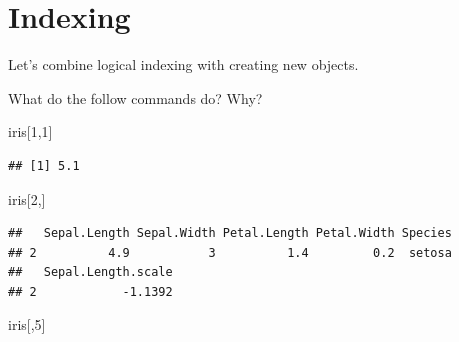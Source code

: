 \documentclass[]{book}
\newenvironment{Shaded}{\begin{snugshade}}{\end{snugshade}}
\newcommand{\KeywordTok}[1]{\textcolor[rgb]{0.13,0.29,0.53}{\textbf{#1}}}
\newcommand{\DecValTok}[1]{\textcolor[rgb]{0.00,0.00,0.81}{#1}}
\newcommand{\StringTok}[1]{\textcolor[rgb]{0.31,0.60,0.02}{#1}}
\newcommand{\OperatorTok}[1]{\textcolor[rgb]{0.81,0.36,0.00}{\textbf{#1}}}
\newcommand{\NormalTok}[1]{#1}
\theoremstyle{definition}
\theoremstyle{definition}
\theoremstyle{definition}
\theoremstyle{remark}
\begin{document}
\begin{Shaded}
\end{Shaded}

\section{Indexing}\label{indexing}

Let's combine logical indexing with creating new objects.

What do the follow commands do? Why?

\begin{Shaded}
\begin{Highlighting}[]
\NormalTok{iris[}\DecValTok{1}\NormalTok{,}\DecValTok{1}\NormalTok{]}
\end{Highlighting}
\end{Shaded}

\begin{verbatim}
## [1] 5.1
\end{verbatim}

\begin{Shaded}
\begin{Highlighting}[]
\NormalTok{iris[}\DecValTok{2}\NormalTok{,]}
\end{Highlighting}
\end{Shaded}

\begin{verbatim}
##   Sepal.Length Sepal.Width Petal.Length Petal.Width Species
## 2          4.9           3          1.4         0.2  setosa
##   Sepal.Length.scale
## 2            -1.1392
\end{verbatim}

\begin{Shaded}
\begin{Highlighting}[]
\NormalTok{iris[,}\DecValTok{5}\NormalTok{]}
\end{Highlighting}
\end{Shaded}
\end{document}
